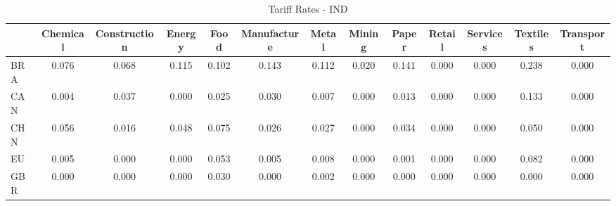 \begin{table}[htbp]
\centering
\caption{Tariff Rates - IND} 
\label{tab:tariffs_IND}
\begin{tabular}{lcccccccccccc}
  \hline
 & Chemical & Construction & Energy & Food & Manufacture & Metal & Mining & Paper & Retail & Services & Textiles & Transport \\ 
  \hline
BRA & \textcolor[RGB]{32,21,223}{0.076} & \textcolor[RGB]{36,23,219}{0.068} & \textcolor[RGB]{19,12,236}{0.115} & \textcolor[RGB]{23,15,232}{0.102} & \textcolor[RGB]{8,5,246}{0.143} & \textcolor[RGB]{21,14,234}{0.112} & \textcolor[RGB]{100,65,155}{0.020} & \textcolor[RGB]{11,7,244}{0.141} & \textcolor[RGB]{255,165,0}{0.000} & \textcolor[RGB]{255,165,0}{0.000} & \textcolor[RGB]{0,0,255}{0.238} & \textcolor[RGB]{255,165,0}{0.000} \\ 
  CAN & \textcolor[RGB]{119,77,136}{0.004} & \textcolor[RGB]{62,40,193}{0.037} & \textcolor[RGB]{132,85,123}{0.000} & \textcolor[RGB]{87,56,168}{0.025} & \textcolor[RGB]{74,48,181}{0.030} & \textcolor[RGB]{110,72,144}{0.007} & \textcolor[RGB]{255,165,0}{0.000} & \textcolor[RGB]{106,69,149}{0.013} & \textcolor[RGB]{255,165,0}{0.000} & \textcolor[RGB]{255,165,0}{0.000} & \textcolor[RGB]{15,10,240}{0.133} & \textcolor[RGB]{255,165,0}{0.000} \\ 
  CHN & \textcolor[RGB]{45,29,210}{0.056} & \textcolor[RGB]{104,67,151}{0.016} & \textcolor[RGB]{55,36,200}{0.048} & \textcolor[RGB]{34,22,221}{0.075} & \textcolor[RGB]{85,55,170}{0.026} & \textcolor[RGB]{81,52,174}{0.027} & \textcolor[RGB]{255,165,0}{0.000} & \textcolor[RGB]{68,44,187}{0.034} & \textcolor[RGB]{255,165,0}{0.000} & \textcolor[RGB]{255,165,0}{0.000} & \textcolor[RGB]{53,34,202}{0.050} & \textcolor[RGB]{255,165,0}{0.000} \\ 
  EU & \textcolor[RGB]{115,74,140}{0.005} & \textcolor[RGB]{134,87,121}{0.000} & \textcolor[RGB]{255,165,0}{0.000} & \textcolor[RGB]{49,32,206}{0.053} & \textcolor[RGB]{113,73,142}{0.005} & \textcolor[RGB]{108,70,147}{0.008} & \textcolor[RGB]{255,165,0}{0.000} & \textcolor[RGB]{128,82,128}{0.001} & \textcolor[RGB]{255,165,0}{0.000} & \textcolor[RGB]{255,165,0}{0.000} & \textcolor[RGB]{28,18,227}{0.082} & \textcolor[RGB]{255,165,0}{0.000} \\ 
  GBR & \textcolor[RGB]{134,87,121}{0.000} & \textcolor[RGB]{255,165,0}{0.000} & \textcolor[RGB]{255,165,0}{0.000} & \textcolor[RGB]{72,47,183}{0.030} & \textcolor[RGB]{255,165,0}{0.000} & \textcolor[RGB]{121,78,134}{0.002} & \textcolor[RGB]{255,165,0}{0.000} & \textcolor[RGB]{255,165,0}{0.000} & \textcolor[RGB]{255,165,0}{0.000} & \textcolor[RGB]{255,165,0}{0.000} & \textcolor[RGB]{255,165,0}{0.000} & \textcolor[RGB]{255,165,0}{0.000} \\ 

\end{tabular}
\end{table}
